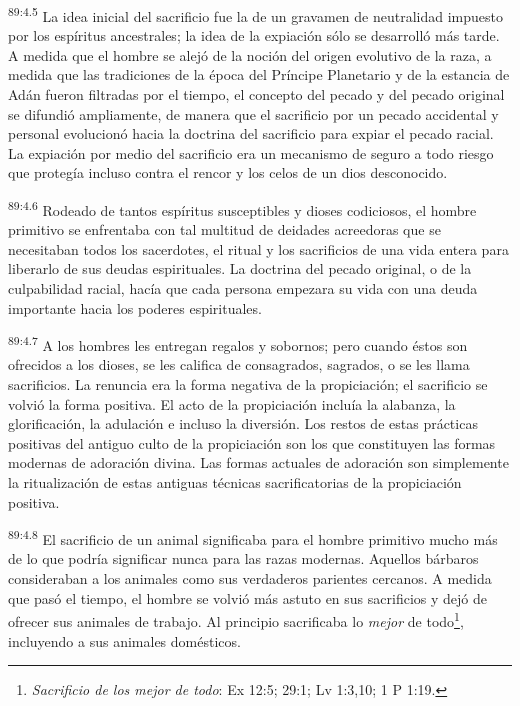 \par
\textsuperscript{89:4.5} La idea inicial del sacrificio fue la de un gravamen de neutralidad impuesto por los espíritus ancestrales; la idea de la expiación sólo se desarrolló más tarde. A medida que el hombre se alejó de la noción del origen evolutivo de la raza, a medida que las tradiciones de la época del Príncipe Planetario y de la estancia de Adán fueron filtradas por el tiempo, el concepto del pecado y del pecado original se difundió ampliamente, de manera que el sacrificio por un pecado accidental y personal evolucionó hacia la doctrina del sacrificio para expiar el pecado racial. La expiación por medio del sacrificio era un mecanismo de seguro a todo riesgo que protegía incluso contra el rencor y los celos de un dios desconocido.

\par
\textsuperscript{89:4.6} Rodeado de tantos espíritus susceptibles y dioses codiciosos, el hombre primitivo se enfrentaba con tal multitud de deidades acreedoras que se necesitaban todos los sacerdotes, el ritual y los sacrificios de una vida entera para liberarlo de sus deudas espirituales. La doctrina del pecado original, o de la culpabilidad racial, hacía que cada persona empezara su vida con una deuda importante hacia los poderes espirituales.

\par
\textsuperscript{89:4.7} A los hombres les entregan regalos y sobornos; pero cuando éstos son ofrecidos a los dioses, se les califica de consagrados, sagrados, o se les llama sacrificios. La renuncia era la forma negativa de la propiciación; el sacrificio se volvió la forma positiva. El acto de la propiciación incluía la alabanza, la glorificación, la adulación e incluso la diversión. Los restos de estas prácticas positivas del antiguo culto de la propiciación son los que constituyen las formas modernas de adoración divina. Las formas actuales de adoración son simplemente la ritualización de estas antiguas técnicas sacrificatorias de la propiciación positiva.

\par
\textsuperscript{89:4.8} El sacrificio de un animal significaba para el hombre primitivo mucho más de lo que podría significar nunca para las razas modernas. Aquellos bárbaros consideraban a los animales como sus verdaderos parientes cercanos. A medida que pasó el tiempo, el hombre se volvió más astuto en sus sacrificios y dejó de ofrecer sus animales de trabajo. Al principio sacrificaba lo \textit{mejor} de todo\footnote{\textit{Sacrificio de los mejor de todo}: Ex 12:5; 29:1; Lv 1:3,10; 1 P 1:19.}, incluyendo a sus animales domésticos.

